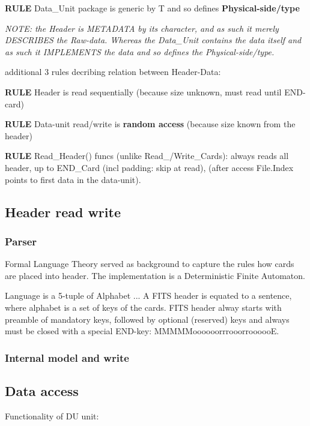\documentclass[a4paper,10pt]{article}
\begin{document}
\textbf{RULE} Data\_Unit package is generic by T and so defines \textbf{Physical-side/type}

\textit{NOTE: the Header is METADATA by its character, and as such it merely DESCRIBES
the Raw-data. Whereas the Data\_Unit contains the data itself and as such it IMPLEMENTS
the data and so defines the Physical-side/type.}

additional 3 rules decribing relation between Header-Data:

\textbf{RULE} Header is read sequentially (because size unknown, must read until END-card)

\textbf{RULE} Data-unit read/write is \textbf{random access} (because size known from the header)

\textbf{RULE} Read\_Header() funcs (unlike Read\_/Write\_Cards):
always reads all header, up to END\_Card (incl padding: skip at read), (after access
File.Index points to first data in the data-unit).





\subsection{Header read write}

\subsubsection{Parser}

Formal Language Theory served as background to capture the rules how cards are placed 
into header. The implementation is a Deterministic Finite Automaton.

Language is a 5-tuple of Alphabet ...
A FITS header is equated to a sentence, where alphabet is a set of keys of the cards.
FITS header alway starts with preamble of mandatory keys, followed by optional (reserved) keys
and always must be closed with a special END-key: MMMMMoooooorrrooorroooooE.


\subsubsection{Internal model and write}



\subsection{Data access}

Functionality of DU unit:
\end{document}
